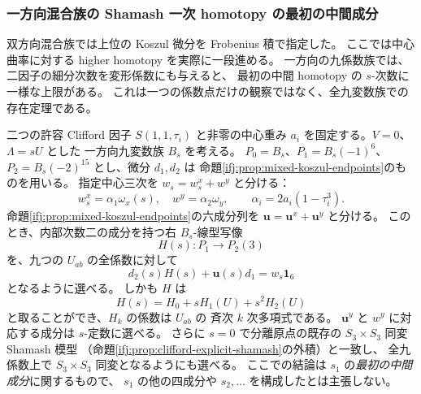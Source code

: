\subsubsection{一方向混合族の Shamash 一次 homotopy の最初の中間成分}
\label{ifj:subsubsec:mixed-shamash-first-middle}

双方向混合族では上位の Koszul 微分を Frobenius 積で指定した。
ここでは中心曲率に対する higher homotopy を実際に一段進める。
一方向の九係数族では、二因子の細分次数を変形係数にも与えると、
最初の中間 homotopy の $s$-次数に一様な上限がある。
これは一つの係数点だけの観察ではなく、全九変数族での存在定理である。

\begin{proposition}
\label{ifj:prop:mixed-shamash-first-middle}
二つの許容 Clifford 因子 $S(1,1,\tau_i)$ と非零の中心重み
$a_i$ を固定する。$V=0$、$\Lambda=sU$ とした
一方向九変数族 $B_s$ を考える。
$P_0=B_s$、$P_1=B_s(-1)^6$、
$P_2=B_s(-2)^{15}$ とし、微分 $d_1,d_2$ は
命題\ref{ifj:prop:mixed-koszul-endpoints}のものを用いる。
指定中心三次を $w_s=w_s^x+w^y$ と分ける：
\[
 w_s^x=\alpha_1\omega_x(s),\quad w^y=\alpha_2\omega_y,
 \qquad \alpha_i=2a_i(1-\tau_i^3).
\]
命題\ref{ifj:prop:mixed-koszul-endpoints}の六成分列を
$\mathbf u=\mathbf u^x+\mathbf u^y$ と分ける。
このとき、内部次数二の成分を持つ右 $B_s$-線型写像
\[
 H(s):P_1\longrightarrow P_2(3)
\]
を、九つの $U_{ab}$ の全係数に対して
\begin{equation}\label{ifj:eq:mixed-shamash-first-middle}
 \boxed{\ d_2(s)H(s)+\mathbf u(s)d_1=w_s\mathbf1_6\ }
\end{equation}
となるように選べる。
しかも $H$ は
\begin{equation}\label{ifj:eq:mixed-shamash-quadratic-bound}
 H(s)=H_0+sH_1(U)+s^2H_2(U)
\end{equation}
と取ることができ、$H_k$ の係数は $U_{ab}$ の
斉次 $k$ 次多項式である。
$\mathbf u^y$ と $w^y$ に対応する成分は $s$-定数に選べる。
さらに $s=0$ で分離原点の既存の
$S_3\times S_3$ 同変 Shamash 模型
（命題\ref{ifj:prop:clifford-explicit-shamash}の外積）と一致し、
全九係数上で $S_3\times S_3$ 同変となるようにも選べる。
ここでの結論は $s_1$ の\emph{最初の中間成分}に関するもので、
$s_1$ の他の四成分や $s_2,\ldots$ を構成したとは主張しない。
\end{proposition}

